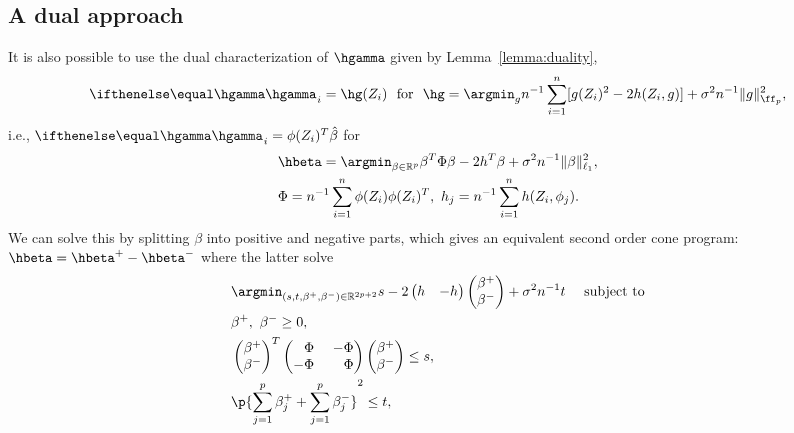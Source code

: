 \subsection{A dual approach}
It is also possible to use the dual characterization of $\hgamma$ given by Lemma~\ref{lemma:duality},
\[ \hriesz_i = \hg(Z_i) \ \text{ for }\ \hg = \argmin_g n^{-1}\sum_{i=1}^n [g(Z_i)^2 - 2 h(Z_i, g)] + \sigma^2 n^{-1}\norm{g}_{\ff_p}^2, \]
i.e., $\hriesz_i = \phi(Z_i)^T \hat\beta$ for 
\begin{align*}
&\hbeta = \argmin_{\beta \in \R^p} \beta^T \Phi \beta - 2h^T \beta + \sigma^2 n^{-1}\norm{\beta}_{\ell_1}^2, \\ 
&\Phi = n^{-1}\sum_{i=1}^n \phi(Z_i)\phi(Z_i)^T, \ h_j = n^{-1}\sum_{i=1}^n h(Z_i, \phi_j).
\end{align*}
We can solve this by splitting $\beta$ into positive and negative parts, which gives an equivalent second order cone program: $\hbeta=\hbeta^+ - \hbeta^-$ where the latter solve 
\begin{align*}
&\argmin_{(s,t,\beta^+, \beta^-) \in \R^{2p+2}} s - 2\begin{pmatrix} h & -h\end{pmatrix}\begin{pmatrix}\beta^+ \\ \beta^-\end{pmatrix} + \sigma^2 n^{-1} t \quad \text{ subject to} \\
&\beta^+,\ \beta^- \ge 0, \\
&\begin{pmatrix}
\beta^+ \\
\beta^-
\end{pmatrix}^T
\begin{pmatrix}
\hphantom{-}\Phi &\ -\Phi \\ 
-\Phi            &\ \hphantom{-}\Phi
\end{pmatrix}
\begin{pmatrix}
\beta^+ \\
\beta^-
\end{pmatrix} \le s, \\
&\p{ \sum_{j=1}^p \beta^+_j + \sum_{j=1}^p \beta^{-}_j}^2 \le t, \\
\end{align*}


